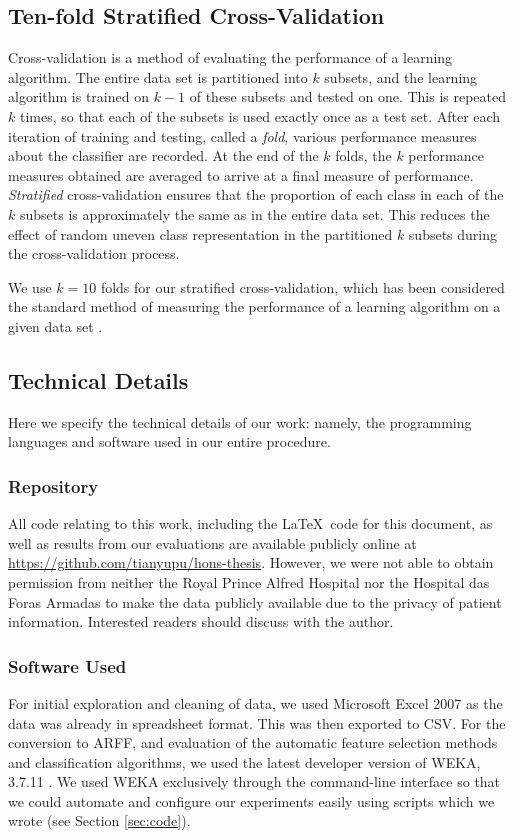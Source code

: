 \subsection{Ten-fold Stratified Cross-Validation}
Cross-validation is a method of evaluating the performance of a learning
algorithm. The entire data set is partitioned into $k$ subsets, and the
learning algorithm is trained on $k-1$ of these subsets and tested on one. This
is repeated $k$ times, so that each of the subsets is used exactly once as a
test set. After each iteration of training and testing, called a \textit{fold},
various performance measures about the classifier are recorded. At the end of
the $k$ folds, the $k$ performance measures obtained are averaged to arrive at
a final measure of performance. \textit{Stratified} cross-validation ensures
that the proportion of each class in each of the $k$ subsets is approximately
the same as in the entire data set. This reduces the effect of random uneven
class representation in the partitioned $k$ subsets during the cross-validation
process.

We use $k=10$ folds for our stratified cross-validation, which has been
considered the standard method of measuring the performance of a learning
algorithm on a given data set \cite{Witten2005}.

\subsection{Technical Details}
Here we specify the technical details of our work: namely, the programming
languages and software used in our entire procedure.

\subsubsection{Repository}
All code relating to this work, including the \LaTeX\ code for this document,
as well as results from our evaluations are available publicly online at
\url{https://github.com/tianyupu/hons-thesis}. However, we were not able to
obtain permission from neither the Royal Prince Alfred Hospital nor the
Hospital das Foras Armadas to make the data publicly available due to the
privacy of patient information. Interested readers should discuss with the
author.

\subsubsection{Software Used}
For initial exploration and cleaning of data, we used Microsoft Excel 2007
as the data was already in spreadsheet format. This was then exported to
CSV. For the conversion to ARFF, and evaluation of the automatic
feature selection methods and classification algorithms, we used the latest
developer version of WEKA, 3.7.11 \cite{Hall2009}. We used WEKA exclusively
through the command-line interface so that we could automate and configure
our experiments easily using scripts which we wrote (see Section
\ref{sec:code}).

